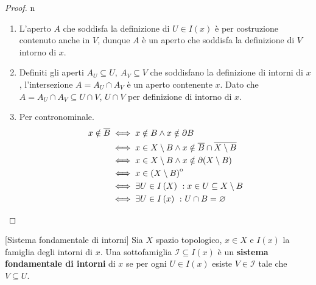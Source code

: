 \begin{proof}{n}~{}
\begin{enumerate}[label=\Roman*]
\item L'aperto $A$ che soddisfa la definizione di $U\in I\left(x\right)$ è per costruzione contenuto anche in $V$, dunque $A$ è un aperto che soddisfa la definizione di $V$ intorno di $x$.
\item Definiti gli aperti $A_U\subseteq U,\ A_V\subseteq V$ che soddisfano la definizione di intorni di $x$, l'intersezione $A=A_U\cap A_V$ è un aperto contenente $x$. Dato che $A=A_U\cap A_V\subseteq U\cap V$, $U\cap V$ per definizione di intorno di $x$.
\item Per contronominale.
\begin{align*}
	x\notin \overline{B} &\iff x\notin B \wedge x\notin \partial B\\
	&\iff x\in X\setminus B \wedge x\notin \overline{B}\cap\overline{X\setminus B}\\
	& \iff x\in X\setminus B \wedge x\notin \partial (X\setminus B)\\
	& \iff x\in {\kern0pt\left(X\setminus B\right)}^{\mathrm{o}}\\
	& \iff \exists U\in I\left(X\right)\ : x\in U\subseteq X\setminus B\\
	&\iff \exists U\in I\left(x\right)\ \colon U\cap B=\varnothing\qedhere
\end{align*} 
\end{enumerate}
\end{proof}
\begin{definition}{}[Sistema fondamentale di intorni]
Sia $X$ spazio topologico, $x\in X$ e $I\left(x\right)$ la famiglia degli intorni di $x$. Una sottofamiglia $\mathcal{I}\subseteq I\left(x\right)$ è un \textbf{sistema fondamentale di intorni} di $x$ se per ogni $ U\in I\left(x\right)$ esiste $V\in\mathcal{I}$ tale che $V\subseteq U$.
\end{definition}
